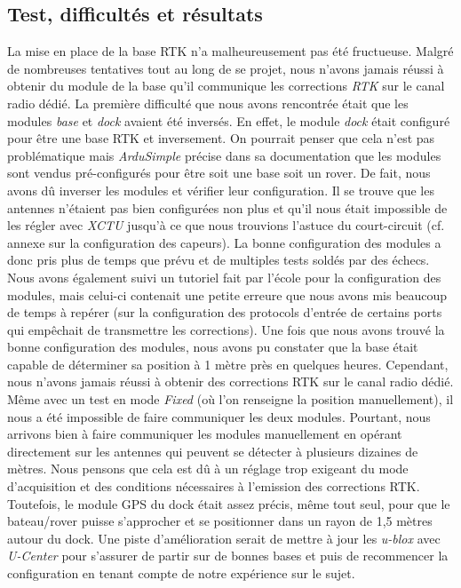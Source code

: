 \documentclass[12pt]{report}
\begin{document}
\subsection{Test, difficultés et résultats}
La mise en place de la base RTK n'a malheureusement pas été fructueuse. Malgré de nombreuses tentatives tout au long de se projet, nous n'avons jamais réussi à obtenir du module de la base qu'il communique les corrections \textit{RTK} sur le canal radio dédié.
La première difficulté que nous avons rencontrée était que les modules \textit{base} et \textit{dock} avaient été inversés. En effet, le module \textit{dock} était configuré pour être une base RTK et inversement.
On pourrait penser que cela n'est pas problématique mais \textit{ArduSimple} précise dans sa documentation que les modules sont vendus pré-configurés pour être soit une base soit un rover. De fait, nous avons dû inverser les modules et vérifier leur configuration.
Il se trouve que les antennes n'étaient pas bien configurées non plus et qu'il nous était impossible de les régler avec \textit{XCTU} jusqu'à ce que nous trouvions l'astuce du court-circuit (cf. annexe sur la configuration des capeurs).
La bonne configuration des modules a donc pris plus de temps que prévu et de multiples tests soldés par des échecs. Nous avons également suivi un tutoriel fait par l'école pour la configuration des modules, mais celui-ci contenait une petite erreure que nous avons mis beaucoup de temps à repérer (sur la configuration des protocols d'entrée de certains ports qui empêchait de transmettre les corrections).
Une fois que nous avons trouvé la bonne configuration des modules, nous avons pu constater que la base était capable de déterminer sa position à 1 mètre près en quelques heures. Cependant, nous n'avons jamais réussi à obtenir des corrections RTK sur le canal radio dédié.
Même avec un test en mode \textit{Fixed} (où l'on renseigne la position manuellement), il nous a été impossible de faire communiquer les deux modules. 
Pourtant, nous arrivons bien à faire communiquer les modules manuellement en opérant directement sur les antennes qui peuvent se détecter à plusieurs dizaines de mètres.
Nous pensons que cela est dû à un réglage trop exigeant du mode d'acquisition et des conditions nécessaires à l'emission des corrections RTK. Toutefois, le module GPS du dock était assez précis, même tout seul, pour que le bateau/rover puisse s'approcher et se positionner dans un rayon de 1,5 mètres autour du dock.
Une piste d'amélioration serait de mettre à jour les \textit{u-blox} avec \textit{U-Center} pour s'assurer de partir sur de bonnes bases et puis de recommencer la configuration en tenant compte de notre expérience sur le sujet.
\end{document}
